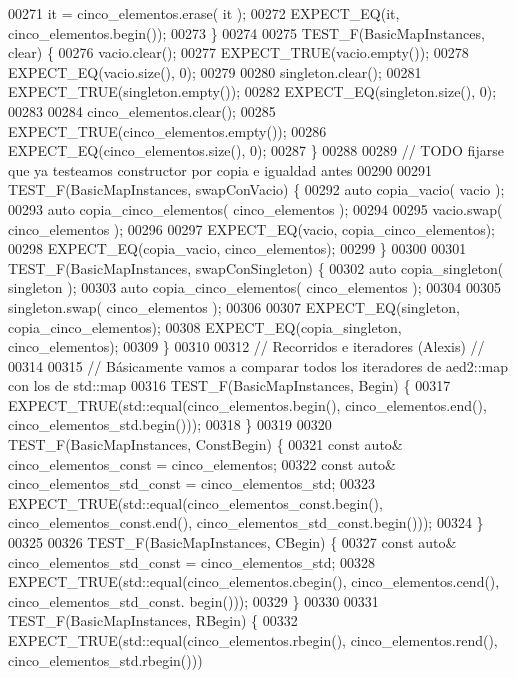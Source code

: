 \begin{DoxyCode}
00271     it = cinco\_elementos.erase( it );
00272     EXPECT\_EQ(it, cinco\_elementos.begin());
00273 \}
00274 
00275 TEST\_F(BasicMapInstances, clear) \{
00276     vacio.clear();
00277     EXPECT\_TRUE(vacio.empty());
00278     EXPECT\_EQ(vacio.size(), 0);
00279 
00280     singleton.clear();
00281     EXPECT\_TRUE(singleton.empty());
00282     EXPECT\_EQ(singleton.size(), 0);
00283 
00284     cinco\_elementos.clear();
00285     EXPECT\_TRUE(cinco\_elementos.empty());
00286     EXPECT\_EQ(cinco\_elementos.size(), 0);
00287 \}
00288 
00289 \textcolor{comment}{// TODO fijarse que ya testeamos constructor por copia e igualdad antes}
00290 
00291 TEST\_F(BasicMapInstances, swapConVacio) \{
00292     \textcolor{keyword}{auto} copia\_vacio( vacio );
00293     \textcolor{keyword}{auto} copia\_cinco\_elementos( cinco\_elementos );
00294 
00295     vacio.swap( cinco\_elementos );
00296 
00297     EXPECT\_EQ(vacio, copia\_cinco\_elementos);
00298     EXPECT\_EQ(copia\_vacio, cinco\_elementos);
00299 \}
00300 
00301 TEST\_F(BasicMapInstances, swapConSingleton) \{
00302     \textcolor{keyword}{auto} copia\_singleton( singleton );
00303     \textcolor{keyword}{auto} copia\_cinco\_elementos( cinco\_elementos );
00304 
00305     singleton.swap( cinco\_elementos );
00306 
00307     EXPECT\_EQ(singleton, copia\_cinco\_elementos);
00308     EXPECT\_EQ(copia\_singleton, cinco\_elementos);
00309 \}
00310 
00312 \textcolor{comment}{// Recorridos e iteradores (Alexis) //}
00314 \textcolor{comment}{}
00315 \textcolor{comment}{// Básicamente vamos a comparar todos los iteradores de aed2::map con los de std::map}
00316 TEST\_F(BasicMapInstances, Begin) \{
00317     EXPECT\_TRUE(std::equal(cinco\_elementos.begin(), cinco\_elementos.end(), cinco\_elementos\_std.begin()));
00318 \}
00319 
00320 TEST\_F(BasicMapInstances, ConstBegin) \{
00321     \textcolor{keyword}{const} \textcolor{keyword}{auto}& cinco\_elementos\_const = cinco\_elementos;
00322     \textcolor{keyword}{const} \textcolor{keyword}{auto}& cinco\_elementos\_std\_const = cinco\_elementos\_std;
00323     EXPECT\_TRUE(std::equal(cinco\_elementos\_const.begin(), cinco\_elementos\_const.end(), 
      cinco\_elementos\_std\_const.begin()));
00324 \}
00325 
00326 TEST\_F(BasicMapInstances, CBegin) \{
00327     \textcolor{keyword}{const} \textcolor{keyword}{auto}& cinco\_elementos\_std\_const = cinco\_elementos\_std;
00328     EXPECT\_TRUE(std::equal(cinco\_elementos.cbegin(), cinco\_elementos.cend(), cinco\_elementos\_std\_const.
      begin()));
00329 \}
00330 
00331 TEST\_F(BasicMapInstances, RBegin) \{
00332     EXPECT\_TRUE(std::equal(cinco\_elementos.rbegin(), cinco\_elementos.rend(), cinco\_elementos\_std.rbegin()))

\end{DoxyCode}
